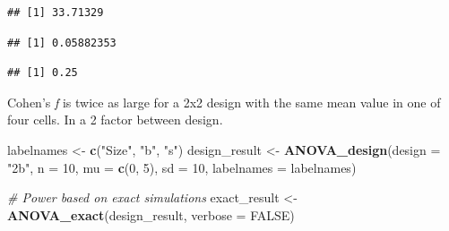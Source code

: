 \documentclass[]{book}
\newenvironment{Shaded}{\begin{snugshade}}{\end{snugshade}}
\newcommand{\CommentTok}[1]{\textcolor[rgb]{0.56,0.35,0.01}{\textit{#1}}}
\newcommand{\DataTypeTok}[1]{\textcolor[rgb]{0.13,0.29,0.53}{#1}}
\newcommand{\DecValTok}[1]{\textcolor[rgb]{0.00,0.00,0.81}{#1}}
\newcommand{\KeywordTok}[1]{\textcolor[rgb]{0.13,0.29,0.53}{\textbf{#1}}}
\newcommand{\NormalTok}[1]{#1}
\newcommand{\OperatorTok}[1]{\textcolor[rgb]{0.81,0.36,0.00}{\textbf{#1}}}
\newcommand{\OtherTok}[1]{\textcolor[rgb]{0.56,0.35,0.01}{#1}}
\newcommand{\StringTok}[1]{\textcolor[rgb]{0.31,0.60,0.02}{#1}}
\begin{document}
\begin{Shaded}
\end{Shaded}

\begin{verbatim}
## [1] 33.71329
\end{verbatim}

\begin{Shaded}
\end{Shaded}

\begin{verbatim}
## [1] 0.05882353
\end{verbatim}

\begin{Shaded}
\end{Shaded}

\begin{verbatim}
## [1] 0.25
\end{verbatim}

Cohen's \emph{f} is twice as large for a 2x2 design with the same mean value in one of four cells. In a 2 factor between design.

\begin{Shaded}
\begin{Highlighting}[]
\NormalTok{labelnames <-}\StringTok{ }\KeywordTok{c}\NormalTok{(}\StringTok{"Size"}\NormalTok{, }\StringTok{"b"}\NormalTok{, }\StringTok{"s"}\NormalTok{)}
\NormalTok{design_result <-}\StringTok{ }\KeywordTok{ANOVA_design}\NormalTok{(}\DataTypeTok{design =} \StringTok{"2b"}\NormalTok{, }
                              \DataTypeTok{n =} \DecValTok{10}\NormalTok{,  }
                              \DataTypeTok{mu =} \KeywordTok{c}\NormalTok{(}\DecValTok{0}\NormalTok{, }\DecValTok{5}\NormalTok{), }
                              \DataTypeTok{sd =} \DecValTok{10}\NormalTok{, }
                              \DataTypeTok{labelnames =}\NormalTok{ labelnames) }

\CommentTok{# Power based on exact simulations}
\NormalTok{exact_result <-}\StringTok{ }\KeywordTok{ANOVA_exact}\NormalTok{(design_result,}
                            \DataTypeTok{verbose =} \OtherTok{FALSE}\NormalTok{)}
\end{Highlighting}
\end{Shaded}
\end{document}
